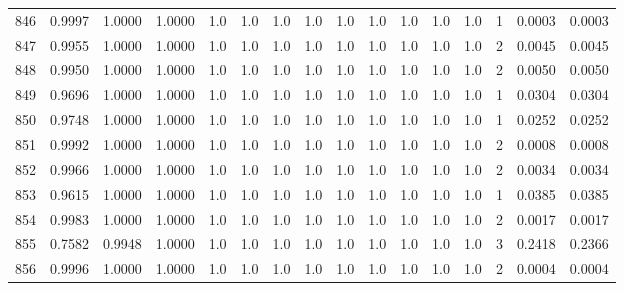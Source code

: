 \begin{tabular}{lrrrrrrrrrrrrrrr}
846 &      0.9997 &  1.0000 &  1.0000 &     1.0 &     1.0 &     1.0 &     1.0 &     1.0 &     1.0 &     1.0 &      1.0 &        1.0 &      1 &                    0.0003 &                     0.0003 \\
847 &      0.9955 &  1.0000 &  1.0000 &     1.0 &     1.0 &     1.0 &     1.0 &     1.0 &     1.0 &     1.0 &      1.0 &        1.0 &      2 &                    0.0045 &                     0.0045 \\
848 &      0.9950 &  1.0000 &  1.0000 &     1.0 &     1.0 &     1.0 &     1.0 &     1.0 &     1.0 &     1.0 &      1.0 &        1.0 &      2 &                    0.0050 &                     0.0050 \\
849 &      0.9696 &  1.0000 &  1.0000 &     1.0 &     1.0 &     1.0 &     1.0 &     1.0 &     1.0 &     1.0 &      1.0 &        1.0 &      1 &                    0.0304 &                     0.0304 \\
850 &      0.9748 &  1.0000 &  1.0000 &     1.0 &     1.0 &     1.0 &     1.0 &     1.0 &     1.0 &     1.0 &      1.0 &        1.0 &      1 &                    0.0252 &                     0.0252 \\
851 &      0.9992 &  1.0000 &  1.0000 &     1.0 &     1.0 &     1.0 &     1.0 &     1.0 &     1.0 &     1.0 &      1.0 &        1.0 &      2 &                    0.0008 &                     0.0008 \\
852 &      0.9966 &  1.0000 &  1.0000 &     1.0 &     1.0 &     1.0 &     1.0 &     1.0 &     1.0 &     1.0 &      1.0 &        1.0 &      2 &                    0.0034 &                     0.0034 \\
853 &      0.9615 &  1.0000 &  1.0000 &     1.0 &     1.0 &     1.0 &     1.0 &     1.0 &     1.0 &     1.0 &      1.0 &        1.0 &      1 &                    0.0385 &                     0.0385 \\
854 &      0.9983 &  1.0000 &  1.0000 &     1.0 &     1.0 &     1.0 &     1.0 &     1.0 &     1.0 &     1.0 &      1.0 &        1.0 &      2 &                    0.0017 &                     0.0017 \\
855 &      0.7582 &  0.9948 &  1.0000 &     1.0 &     1.0 &     1.0 &     1.0 &     1.0 &     1.0 &     1.0 &      1.0 &        1.0 &      3 &                    0.2418 &                     0.2366 \\
856 &      0.9996 &  1.0000 &  1.0000 &     1.0 &     1.0 &     1.0 &     1.0 &     1.0 &     1.0 &     1.0 &      1.0 &        1.0 &      2 &                    0.0004 &                     0.0004 \\

\end{tabular}
